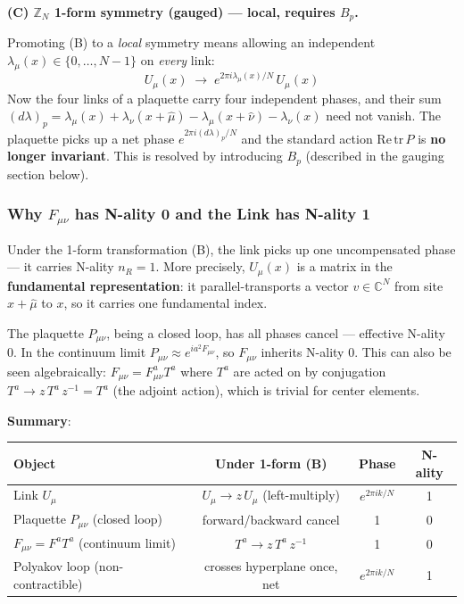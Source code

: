 \documentclass[12pt,a4paper]{article}
\begin{document}
\bigskip
\textbf{(C) $\mathbb{Z}_N$ 1-form symmetry (gauged) --- local, requires $B_p$.}

Promoting (B) to a \emph{local} symmetry means allowing an independent
$\lambda_\mu(x) \in \{0,\ldots,N{-}1\}$ on \emph{every} link:
\begin{equation}
  U_\mu(x) \;\to\; e^{2\pi i\lambda_\mu(x)/N}\,U_\mu(x)
\end{equation}
Now the four links of a plaquette carry four independent phases, and their sum
$(d\lambda)_p = \lambda_\mu(x) + \lambda_\nu(x{+}\hat\mu) - \lambda_\mu(x{+}\hat\nu) - \lambda_\nu(x)$
need not vanish. The plaquette picks up a net phase $e^{2\pi i(d\lambda)_p/N}$ and the
standard action $\mathrm{Re}\,\mathrm{tr}\,P$ is \textbf{no longer invariant}.
This is resolved by introducing $B_p$ (described in the gauging section below).

\subsubsection*{Why $F_{\mu\nu}$ has N-ality 0 and the Link has N-ality 1}

Under the 1-form transformation (B), the link picks up one uncompensated phase ---
it carries N-ality $n_R = 1$.
More precisely, $U_\mu(x)$ is a matrix in the \textbf{fundamental representation}:
it parallel-transports a vector $v \in \mathbb{C}^N$ from site $x{+}\hat\mu$ to $x$,
so it carries one fundamental index.

The plaquette $P_{\mu\nu}$, being a closed loop, has all phases cancel ---
effective N-ality 0.
In the continuum limit $P_{\mu\nu} \approx e^{ia^2 F_{\mu\nu}}$,
so $F_{\mu\nu}$ inherits N-ality 0. This can also be seen algebraically:
$F_{\mu\nu} = F_{\mu\nu}^a T^a$ where $T^a$ are acted on by conjugation
$T^a \to z\,T^a\,z^{-1} = T^a$ (the adjoint action), which is trivial for center elements.

\textbf{Summary}:
\begin{table}[H]
\centering
\begin{tabular}{|l|c|c|c|}
\hline
Object & Under 1-form (B) & Phase & N-ality \\
\hline
Link $U_\mu$ & $U_\mu \to z\,U_\mu$ (left-multiply) & $e^{2\pi ik/N}$ & 1 \\
Plaquette $P_{\mu\nu}$ (closed loop) & forward/backward cancel & 1 & 0 \\
$F_{\mu\nu} = F^a T^a$ (continuum limit) & $T^a \to z\,T^a\,z^{-1}$ & 1 & 0 \\
Polyakov loop (non-contractible) & crosses hyperplane once, net & $e^{2\pi ik/N}$ & 1 \\
\hline
\end{tabular}
\end{table}
\end{document}
